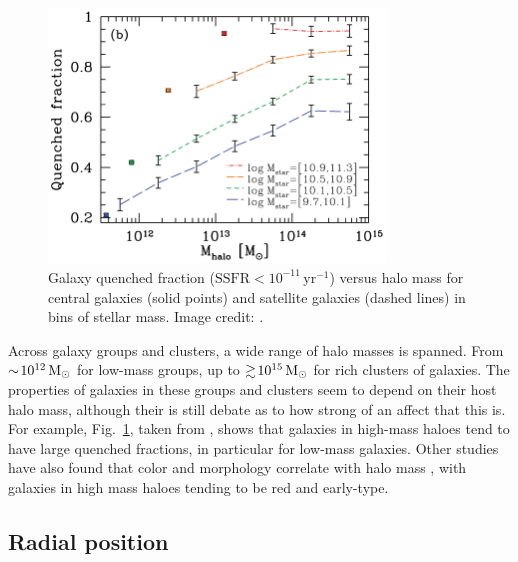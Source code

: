 \begin{figure}
  \centering
  \includegraphics[width=0.8\textwidth]{quenchFrac_wetzel.png}
  \caption[Quenched fraction versus halo mass, for various stellar
    mass bins]{Galaxy quenched fraction ($\mathrm{SSFR} <
    10^{-11}\,\mathrm{yr^{-1}}$) versus halo mass for central galaxies
    (solid points) and satellite galaxies (dashed lines) in bins of stellar mass.  Image credit: \citet{wetzel2012}.}
  \label{fig:quenchFrac_wetzel}
\end{figure}

Across galaxy groups and clusters, a wide range of halo masses is
spanned.  From $\sim\! 10^{12}\,\mathrm{M_{\odot}}$ for low-mass groups, up to
$\gtrsim\! 10^{15}\,\mathrm{M_{\odot}}$ for rich clusters of galaxies.  The
properties of galaxies in these groups and clusters seem to depend on
their host halo mass, although their is still debate as to how strong
of an affect that this is.  For example,
Fig.~\ref{fig:quenchFrac_wetzel}, taken from \citet{wetzel2012}, shows
that galaxies in high-mass haloes tend to have large quenched
fractions, in particular for low-mass galaxies.  Other studies have
also found that color and morphology correlate with halo mass
\citep[e.g.][]{kimm2009, wilman2012}, with galaxies in high mass
haloes tending to be red and early-type.

\subsection{Radial position}
\label{sec:radial_pos}

